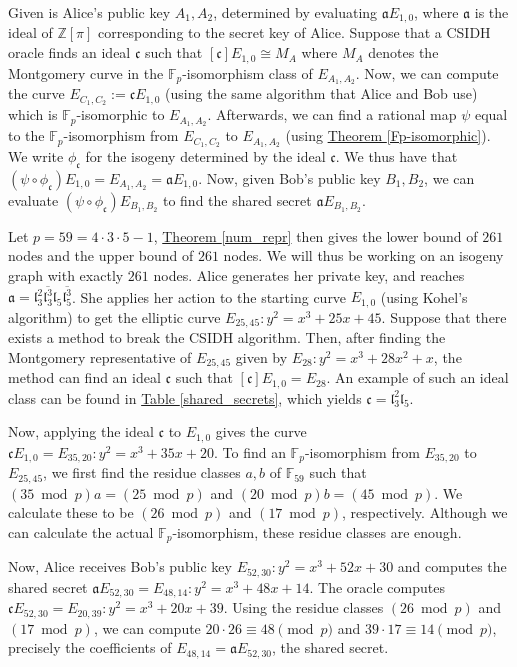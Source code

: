 \documentclass[openany, a4paper, 10pt]{book}
\theoremstyle{plain}
\theoremstyle{plain}
\theoremstyle{plain}
\theoremstyle{definition}
\theoremstyle{plain}
\theoremstyle{definition}
\theoremstyle{remark}
\newcommand{\tabref}[1]{\hyperref[#1]{Table \ref{#1}}}
\newcommand{\theoref}[1]{\hyperref[#1]{Theorem \ref{#1}}}
\begin{document}
Given is Alice's public key $A_1, A_2$, determined by evaluating $\mathfrak a E_{1,0}$, where $\mathfrak a$ is the ideal of $\mathbb Z[\pi]$ corresponding to the secret key of Alice.
Suppose that a CSIDH oracle finds an ideal $\mathfrak c$ such that $[\mathfrak c]E_{1,0} \cong M_A$ where $M_A$ denotes the Montgomery curve in the $\mathbb F_p$-isomorphism class of $E_{A_1, A_2}$.
Now, we can compute the curve $E_{C_1, C_2} := \mathfrak cE_{1,0}$ (using the same algorithm that Alice and Bob use) which is $\mathbb F_p$-isomorphic to $E_{A_1, A_2}$.
Afterwards, we can find a rational map $\psi$ equal to the $\mathbb F_p$-isomorphism from $E_{C_1, C_2}$ to $E_{A_1, A_2}$ (using \theoref{Fp-isomorphic}).
We write $\phi_{\mathfrak c}$ for the isogeny determined by the ideal $\mathfrak c$.
We thus have that $(\psi \circ \phi_{\mathfrak c})E_{1,0} = E_{A_1, A_2} = \mathfrak aE_{1,0}$.
Now, given Bob's public key $B_1,B_2$, we can evaluate $(\psi \circ \phi_{\mathfrak c})E_{B_1,B_2}$ to find the shared secret $\mathfrak a E_{B_1, B_2}$.

\begin{examplebox}
    Let $p=59=4\cdot3\cdot5-1$, \theoref{num_repr} then gives the lower bound of $261$ nodes and the upper bound of $261$ nodes.
    We will thus be working on an isogeny graph with exactly $261$ nodes.
    Alice generates her private key, and reaches $\mathfrak a = \mathfrak l_3^2 \overline{\mathfrak l_3^3} \mathfrak l_5 \overline{\mathfrak l_5^3}$.
    She applies her action to the starting curve $E_{1,0}$ (using Kohel's algorithm) to get the elliptic curve
    $E_{25,45}: y^2 = x^3 + 25x + 45$.
    Suppose that there exists a method to break the CSIDH algorithm.
    Then, after finding the Montgomery representative of $E_{25,45}$ given by $E_{28}: y^2 = x^3 + 28x^2 + x$, the method can find an ideal $\mathfrak c$ such that $[\mathfrak c]E_{1,0}= E_{28}$.
    An example of such an ideal class can be found in \tabref{shared_secrets}, which yields $\mathfrak c = \mathfrak l_3^2 \mathfrak l_5$.

    Now, applying the ideal $\mathfrak c$ to $E_{1,0}$ gives the curve $\mathfrak cE_{1,0} = E_{35,20}: y^2 = x^3 + 35x + 20$.
    To find an $\mathbb F_p$-isomorphism from $E_{35, 20}$ to $E_{25, 45}$, we first find the residue classes $a,b$ of $\mathbb F_{59}$ such that $(35 \bmod p) a = (25 \bmod p)$ and $(20 \bmod p) b = (45 \bmod p)$.
    We calculate these to be $(26 \bmod p)$ and $(17 \bmod p)$, respectively.
    Although we can calculate the actual $\mathbb F_p$-isomorphism, these residue classes are enough.

    Now, Alice receives Bob's public key $E_{52,30}: y^2 = x^3 + 52x + 30$ and computes the shared secret $\mathfrak aE_{52,30} = E_{48,14}: y^2 = x^3 + 48x + 14$.
    The oracle computes $\mathfrak cE_{52, 30} = E_{20, 39}: y^2 = x^3 + 20x + 39$.
    Using the residue classes $(26 \bmod p)$ and $(17 \bmod p)$, we can compute $20 \cdot 26 \equiv 48 \pmod p$ and $39 \cdot 17 \equiv 14 \pmod p$, precisely the coefficients of $E_{48,14}=\mathfrak aE_{52, 30}$, the shared secret.
\end{examplebox}
\end{document}
